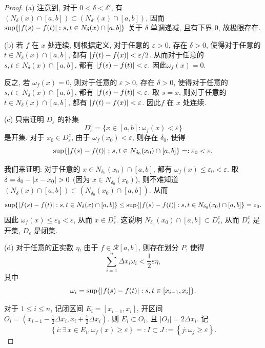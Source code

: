 \documentclass{article}
\begin{document}
\begin{proof}
  (a) 注意到, 对于 \( 0<\delta<\delta' \), 有 \( (N_\delta(x)\cap[a,b])\subset  (N_{\delta'}(x)\cap[a,b]) \), 因而 \( \sup\{\left|f(s) - f(t)\right| : s,t \in N_\delta(x) \cap [a,b]\} \) 关于 $\delta$ 单调递减, 且有下界 \( 0 \), 故极限存在.

  (b) 若 \( f \) 在 \( x \) 处连续, 则根据定义, 对于任意的 \( \varepsilon>0 \), 存在 \( \delta>0 \), 使得对于任意的 \( t\in N_\delta(x)\cap[a,b] \), 都有 \( \left|f(t)-f(x)\right|<\varepsilon/2 \). 从而对于任意的 \( s,t\in N_\delta(x)\cap[a,b] \), 都有 \( \left|f(s)-f(t)\right|<\varepsilon \). 因此\( \omega_f(x)=0 \). 

  反之, 若 \( \omega_f(x)=0 \), 则对于任意的 \( \varepsilon>0 \), 存在 \( \delta>0 \), 使得对于任意的 \( s,t\in N_\delta(x)\cap[a,b] \), 都有 \( \left|f(s)-f(t)\right|<\varepsilon \). 取 \( s=x \), 则对于任意的 \( t\in N_\delta(x)\cap[a,b] \), 都有 \( \left|f(t)-f(x)\right|<\varepsilon \). 因此\( f \) 在 \( x \) 处连续.

  (c) 只需证明 \( D_\varepsilon \) 的补集
  \[ D_\varepsilon^c = \{x \in [a,b] : \omega_f(x) < \varepsilon\} \]
  是开集. 对于 \( x_0\in D_\varepsilon^c \), 由于 \( \omega_f(x_0)<\varepsilon \), 则存在 \( \delta_0 \), 使得
  \[ \sup\{\left|f(s) - f(t)\right| : s,t \in N_{\delta_0}(x_0) \cap [a,b]\}=:\varepsilon_0 < \varepsilon. \]

  我们来证明: 对于任意的 \( x\in N_{\delta_0}(x_0)\cap[a,b] \), 都有 \( \omega_f(x)\le \varepsilon_0<\varepsilon \). 取 \( \delta=\delta_0-\abs{x-x_0}>0 \) (因为 \( x\in N_{\delta_0}(x_0) \)), 则不难知道 \( (N_\delta(x)\cap[a,b])\subset (N_{\delta_0}(x_0)\cap[a,b]) \). 从而
  \[ \sup\{\left|f(s) - f(t)\right| : s,t \in N_\delta(x) \cap [a,b]\} \le \sup\{\left|f(s) - f(t)\right| : s,t \in N_{\delta_0}(x_0) \cap [a,b]\}=\varepsilon_0. \]
  因此 \( \omega_f(x)\le \varepsilon_0<\varepsilon \), 从而 \( x\in D_\varepsilon^c \). 这说明 \( N_{\delta_0}(x_0)\cap[a,b]\subset D_\varepsilon^c \), 从而 \( D_\varepsilon^c \) 是开集, \( D_\varepsilon \) 是闭集.

  (d) 对于任意的正实数 \( \eta \), 由于 \( f \in \mathcal{R}[a,b] \), 则存在划分 \( P \), 使得 
  \[ \sum_{i=1}^{n}\Delta x_i \omega_i < \frac{1}{2}\varepsilon\eta ,\]
  其中
  \[ \omega_i = \sup\{\left|f(s) - f(t)\right| : s,t \in [x_{i-1}, x_i]\}. \]

  对于 \( 1\le i\le n \), 记闭区间 \( E_i=[x_{i-1},x_i] \), 开区间 \( O_i=\left( x_{i-1}-\frac{1}{2}\Delta x_i, x_{i}+\frac{1}{2}\Delta x_i \right) \). 则 \( E_i\subset O_i \), 且 \( |O_i|=2 \Delta x_i \). 记
  \[ \left\{ i: \exists\, x\in E_i, \omega_f(x)\ge \varepsilon \right\}=:I\subset J:=\left\{ j: \omega_j\ge \varepsilon \right\}. \]


\end{proof}
\end{document}
